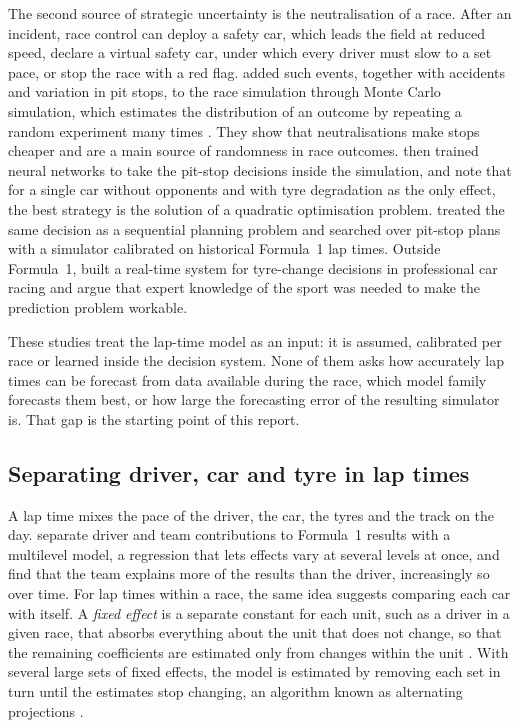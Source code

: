 \documentclass[12pt]{article}
\begin{document}
The second source of strategic uncertainty is the neutralisation of a race. After an incident, race control can deploy
a safety car, which leads the field at reduced speed, declare a virtual safety car, under which every driver must slow
to a set pace, or stop the race with a red flag. \textcite{heilmeier2020mc} added such events, together with accidents
and variation in pit stops, to the race simulation through Monte Carlo simulation, which estimates the distribution of
an outcome by repeating a random experiment many times \parencite{glasserman2003}. They show that neutralisations make
stops cheaper and are a main source of randomness in race outcomes. \textcite{heilmeier2020vse} then trained neural
networks to take the pit-stop decisions inside the simulation, and note that for a single car without opponents and with
tyre degradation as the only effect, the best strategy is the solution of a quadratic optimisation problem.
\textcite{piccinotti2021} treated the same decision as a sequential planning problem and searched over pit-stop plans
with a simulator calibrated on historical Formula~1 lap times. Outside Formula~1, \textcite{tulabandhula2014} built a
real-time system for tyre-change decisions in professional car racing and argue that expert knowledge of the sport was
needed to make the prediction problem workable.

These studies treat the lap-time model as an input: it is assumed, calibrated per race or learned inside the decision
system. None of them asks how accurately lap times can be forecast from data available during the race, which model
family forecasts them best, or how large the forecasting error of the resulting simulator is. That gap is the starting
point of this report.

\subsection{Separating driver, car and tyre in lap times}\label{sec:lit-identification}

A lap time mixes the pace of the driver, the car, the tyres and the track on the day. \textcite{bell2016} separate
driver and team contributions to Formula~1 results with a multilevel model, a regression that lets effects vary at
several levels at once, and find that the team explains more of the results than the driver, increasingly so over
time. For lap times within a race, the same idea suggests comparing each car with itself. A \emph{fixed effect} is a
separate constant for each unit, such as a driver in a given race, that absorbs everything about the unit that does not
change, so that the remaining coefficients are estimated only from changes within the unit
\parencite[ch.~5]{angrist2009}. With several large sets of fixed effects, the model is estimated by removing each set in
turn until the estimates stop changing, an algorithm known as alternating projections
\parencite{guimaraes2010,gaure2013}.
\end{document}
